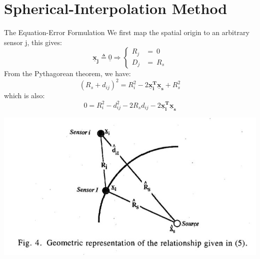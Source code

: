 \documentclass[10pt]{beamer}
\begin{document}
\section{Spherical-Interpolation Method}

\begin{frame}{The Equation-Error Formulation}
  We first map the spatial origin to an arbitrary sensor j, this gives:
  $$ \mathbf{\underline{x}_{j}}\triangleq \underline{0}\Longrightarrow \begin{cases} R_{j} &= \ 0 \\ D_{j} &= \ R_{s} \end{cases}$$
  From the Pythagorean theorem, we have:
  $$(R_{s}+d_{ij})^2 = R_{i}^2 - 2\mathbf{\underline{x}_{i}^T \underline{x}_{s}} + R_{s}^2 $$
  which is also:
  $$ 0 = R_{i}^2 - d_{ij}^2 -2R_{s}d_{ij} - 2\mathbf{\underline{x}_{i}^T \underline{x}_{s}} $$
  \begin{center}
  \includegraphics[scale=0.7]{Pythagorean.JPG}
  \end{center}
\end{frame}
\end{document}

